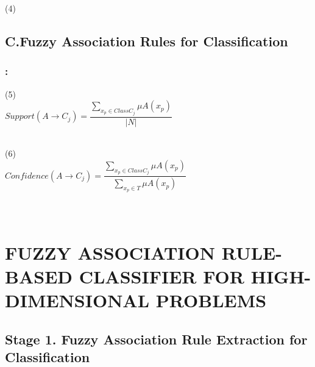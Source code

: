 \documentclass{beamer}
\begin{document}
\begin{CJK*}{UTF8}{bsmi}
\begin{frame}
\begin{block}{ (4)}
		~\\
	\end{block}
	
\end{frame}


\subsection{C.Fuzzy Association Rules for Classification}


\begin{frame}
	\frametitle{\insertsection : \insertsubsection}
	
	\begin{block}{ (5)}
		~\\
		\centering\textbf{$Support(A\longrightarrow C_{j})=\dfrac{\sum_{x_{p}\in ClassC_{j}}^{ }{\mu A(x_{p})}}{|N|}$}\\
		~\\
	\end{block}
	\begin{block}{ (6)}
		~\\
		\centering\textbf{$Confidence(A\longrightarrow C_{j})=\dfrac{\sum_{x_{p}\in ClassC_{j}}^{ }{\mu A(x_{p})}}{\sum_{x_{p}\in T}^{ }{\mu A(x_{p})}}$}\\
		~\\
		
		~\\
	\end{block}
	
\end{frame}


\section{FUZZY ASSOCIATION RULE-BASED CLASSIFIER FOR HIGH-DIMENSIONAL  PROBLEMS}
\subsection{Stage 1. Fuzzy Association Rule Extraction for Classification}



\end{CJK*}
\end{document}
